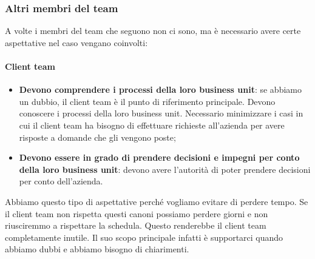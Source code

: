 \subsubsection{Altri membri del team}
A volte i membri del team che seguono non ci sono, ma è necessario avere certe aspettative nel caso vengano coinvolti:
\paragraph{Client team}
\begin{itemize}
	\item \textbf{Devono comprendere i processi della loro business unit}: se abbiamo un dubbio, il client team è il punto di riferimento principale. Devono conoscere i processi della loro business unit. Necessario minimizzare i casi in cui il client team ha bisogno di effettuare richieste all'azienda per avere risposte a domande che gli vengono poste;
	\item \textbf{Devono essere in grado di prendere decisioni e impegni per conto della loro business unit}: devono avere l'autorità di poter prendere decisioni per conto dell'azienda.
\end{itemize}
\begin{info}
	Abbiamo questo tipo di aspettative perché vogliamo evitare di perdere tempo. Se il client team non rispetta questi canoni possiamo perdere giorni e non riusciremmo a rispettare la schedula. Questo renderebbe il client team completamente inutile. Il suo scopo principale infatti è supportarci quando abbiamo dubbi e abbiamo bisogno di chiarimenti.
\end{info}

